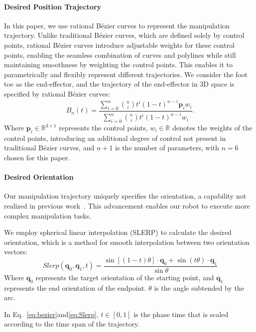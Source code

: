 \paragraph{Desired Position Trajectory} In this paper, we use rational Bézier curves to represent the manipulation trajectory. 
Unlike traditional Bézier curves, which are defined solely by control points, rational Bézier curves introduce adjustable weights for these control points, enabling the
 seamless combination of curves and polylines while still maintaining smoothness by weighting the control points. This enables it to parametrically and flexibly represent different trajectories. We consider the foot toe as the end-effector, and the trajectory of the end-effector in 3D space is specified by rational Bézier curves:
\begin{equation}~\label{eq:bezier}
B_{n}(t)=\frac{\sum_{i=0}^n\binom nit^i(1-t)^{n-i}\mathbf{p}_iw_i}{\sum_{i=0}^n\binom nit^i(1-t)^{n-i}w_i}.
\end{equation}
Where $\mathbf{p}_i \in \mathbb{R}^{3\times1}$ represents the control points, $w_i \in \mathbb{R}$ denotes the weights of the control points, introducing an additional degree of control not present in traditional Bézier curves, and $n+1$ is the number of parameters, with $n=6$ chosen for this paper.


\paragraph{Desired Orientation} 
Our manipulation trajectory uniquely specifies the orientation, a capability not realized in previous work~\cite{cheng2023legmanip, ji2023Hierarchical, arm2024pedipulate}. This advancement enables our robot to execute more complex manipulation tasks.

We employ spherical linear interpolation (SLERP) to calculate the desired orientation, which is a method for smooth interpolation between two orientation vectors:
\begin{equation}~\label{eq:Slerp}
Slerp(\mathbf{q}_{0},\mathbf{q}_{1},t)=\frac{\sin[(1-t)\theta]\cdot \mathbf{q}_{0}+\sin(t\theta)\cdot \mathbf{q}_{1}}{\sin\theta}
\end{equation}
Where $\mathbf{q}_{0}$ represents the target orientation of the starting point, and $\mathbf{q}_{1}$ represents the end orientation of the endpoint. $\theta$ is the angle subtended by the arc. 

In Eq.~\eqref{eq:bezier}and\eqref{eq:Slerp}, $t \in [0,1]$ is the phase time that is scaled according to the time span of the trajectory.

